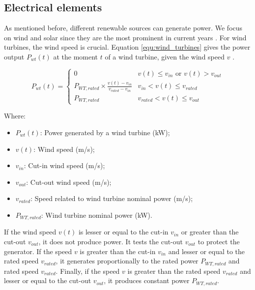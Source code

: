 
\subsection{Electrical elements}
\label{sec:related_work_electrical_elements}
As mentioned before, different renewable sources can generate power. We focus on wind and solar since they are the most prominent in current years \cite{renewables2022}. For wind turbines, the wind speed is crucial. Equation \ref{equ:wind_turbines} gives the power output $P_{wt}(t)$ at the moment $t$ of a wind turbine, given the wind speed $v$ \cite{garcia2006wind, dong2016optimal, maleki2015optimal}.

\begin{equation}
    \label{equ:wind_turbines}
    P_{wt}(t) = \begin{cases}
        0 & v(t) \leq v_{in} \text{ or } v(t) > v_{out} \\
        P_{WT,rated} \times \frac{v(t) - v_{in}}{v_{rated} - v_{in}} & v_{in} < v(t) \leq v_{rated} \\
        P_{WT,rated} & v_{rated} < v(t) \leq v_{out}
    \end{cases}
\end{equation}

Where:
\begin{itemize}
    \item $P_{wt}(t)$: Power generated by a wind turbine (kW);
    \item $v(t)$: Wind speed (m/s);
    \item $v_{in}$: Cut-in wind speed (m/s);
    \item $v_{out}$: Cut-out wind speed (m/s);
    \item $v_{rated}$: Speed related to wind turbine nominal power (m/s);
    \item $P_{WT,rated}$: Wind turbine nominal power (kW).
\end{itemize}

If the wind speed $v(t)$ is lesser or equal to the cut-in $v_{in}$  or greater than the cut-out $v_{out}$, it does not produce power. It tests the cut-out $v_{out}$ to protect the generator. If the speed $v$ is greater than the cut-in $v_{in}$ and lesser or equal to the rated speed $v_{rated}$, it generates proportionally to the rated power $P_{WT,rated}$ and rated speed $v_{rated}$. Finally, if the speed $v$ is greater than the rated speed $v_{rated}$ and lesser or equal to the cut-out $v_{out}$, it produces constant power $P_{WT,rated}$. 

